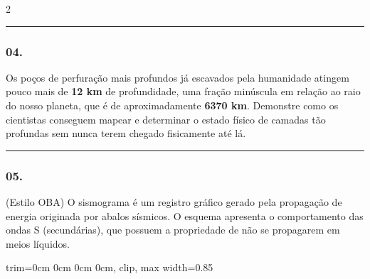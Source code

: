 \documentclass[twoside, 10pt, a4paper]{article}
\newlength{\espacoPreQuestao}
\newlength{\espacoQuestao}
\newcommand{\larguraTikz}{0.85\linewidth}
\begin{document}
\begin{multicols*}{2}
\noindent\textcolor{CorLinha}{\rule{\linewidth}{0.5pt}} 
\par\vspace{\espacoPreQuestao}
\subsubsection*{04.} Os poços de perfuração mais profundos já escavados pela humanidade atingem pouco mais de \textbf{12 km} de profundidade, uma fração minúscula em relação ao raio do nosso planeta, que é de aproximadamente \textbf{6370 km}. Demonstre como os cientistas conseguem mapear e determinar o estado físico de camadas tão profundas sem nunca terem chegado fisicamente até lá.
\par\vspace{\espacoQuestao}

\noindent\textcolor{CorLinha}{\rule{\linewidth}{0.5pt}} 
\par\vspace{\espacoPreQuestao}
\subsubsection*{05.} (Estilo OBA) O sismograma é um registro gráfico gerado pela propagação de energia originada por abalos sísmicos. O esquema apresenta o comportamento das ondas S (secundárias), que possuem a propriedade de não se propagarem em meios líquidos.

\begin{center}
\begin{adjustbox}{trim=0cm 0cm 0cm 0cm, clip, max width=\larguraTikz}
\end{adjustbox}
\end{center}
\end{multicols*}
\end{document}
